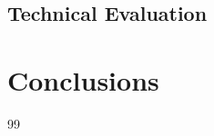 \documentclass[12pt,a4paper]{article}
\begin{document}
\subsection{Technical Evaluation}

\section{Conclusions}

\begin{thebibliography}{99}
\end{thebibliography}
\end{document}
